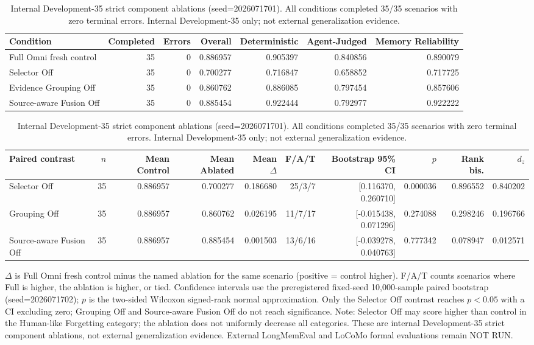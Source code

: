 \begin{table}[t]
\centering\scriptsize
\caption{Internal Development-35 strict component ablations (seed=2026071701). All conditions completed 35/35 scenarios with zero terminal errors. Internal Development-35 only; not external generalization evidence.}
\label{tab:strict-ablations}
\begin{tabular}{lrrrrrr}
\toprule
Condition & Completed & Errors & Overall & Deterministic & Agent-Judged & Memory Reliability \\
\midrule
Full Omni fresh control & 35 & 0 & 0.886957 & 0.905397 & 0.840856 & 0.890079 \\
Selector Off & 35 & 0 & 0.700277 & 0.716847 & 0.658852 & 0.717725 \\
Evidence Grouping Off & 35 & 0 & 0.860762 & 0.886085 & 0.797454 & 0.857606 \\
Source-aware Fusion Off & 35 & 0 & 0.885454 & 0.922444 & 0.792977 & 0.922222 \\
\bottomrule
\end{tabular}

\vspace{0.5em}
\begin{tabular}{lrrrrrrrrr}
\toprule
Paired contrast & $n$ & Mean Control & Mean Ablated & Mean $\Delta$ & F/A/T & Bootstrap 95\% CI & $p$ & Rank bis. & $d_z$ \\
\midrule
Selector Off & 35 & 0.886957 & 0.700277 & 0.186680 & 25/3/7 & [0.116370, 0.260710] & 0.000036 & 0.896552 & 0.840202 \\
Grouping Off & 35 & 0.886957 & 0.860762 & 0.026195 & 11/7/17 & [-0.015438, 0.071296] & 0.274088 & 0.298246 & 0.196766 \\
Source-aware Fusion Off & 35 & 0.886957 & 0.885454 & 0.001503 & 13/6/16 & [-0.039278, 0.040763] & 0.777342 & 0.078947 & 0.012571 \\
\bottomrule
\end{tabular}
\begin{minipage}{0.98\textwidth}\footnotesize
$\Delta$ is Full Omni fresh control minus the named ablation for the same scenario (positive = control higher). F/A/T counts scenarios where Full is higher, the ablation is higher, or tied. Confidence intervals use the preregistered fixed-seed 10,000-sample paired bootstrap (seed=2026071702); $p$ is the two-sided Wilcoxon signed-rank normal approximation. Only the Selector Off contrast reaches $p<0.05$ with a CI excluding zero; Grouping Off and Source-aware Fusion Off do not reach significance. Note: Selector Off may score higher than control in the Human-like Forgetting category; the ablation does not uniformly decrease all categories. These are internal Development-35 strict component ablations, not external generalization evidence. External LongMemEval and LoCoMo formal evaluations remain NOT RUN.
\end{minipage}
\end{table}
